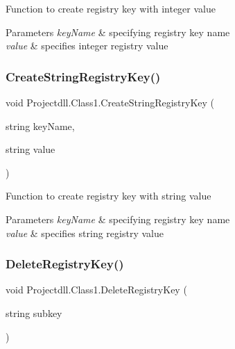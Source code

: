 Function to create registry key with integer value 
\begin{DoxyParams}{Parameters}
{\em key\+Name} & specifying registry key name \\
\hline
{\em value} & specifies integer registry value \\
\hline
\end{DoxyParams}
\mbox{\label{class_projectdll_1_1_class1_adb37c9e1c9992940f14ffc639225d084}} 
\subsubsection{\texorpdfstring{Create\+String\+Registry\+Key()}{CreateStringRegistryKey()}}
{\footnotesize\ttfamily void Projectdll.\+Class1.\+Create\+String\+Registry\+Key (\begin{DoxyParamCaption}\item[{string}]{key\+Name,  }\item[{string}]{value }\end{DoxyParamCaption})}

Function to create registry key with string value 
\begin{DoxyParams}{Parameters}
{\em key\+Name} & specifying registry key name \\
\hline
{\em value} & specifies string registry value \\
\hline
\end{DoxyParams}
\mbox{\label{class_projectdll_1_1_class1_abafd55b942eae3aef08fd4d1fb722d81}} 
\subsubsection{\texorpdfstring{Delete\+Registry\+Key()}{DeleteRegistryKey()}}
{\footnotesize\ttfamily void Projectdll.\+Class1.\+Delete\+Registry\+Key (\begin{DoxyParamCaption}\item[{string}]{subkey }\end{DoxyParamCaption})}

